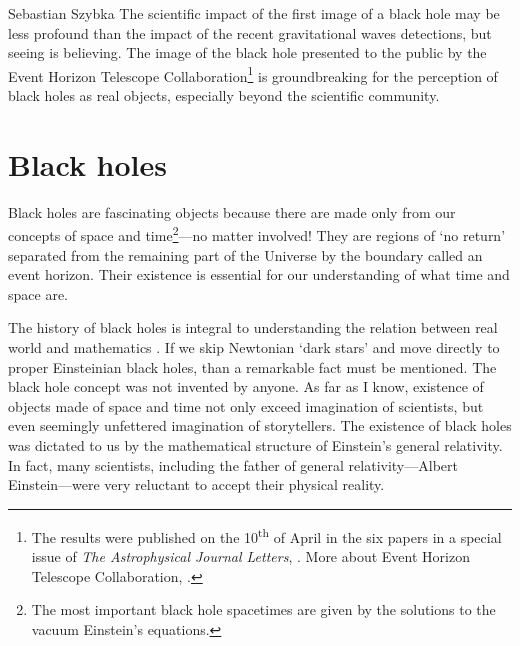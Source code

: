 \begin{artengenv}{Sebastian Szybka}
The scientific impact of the first image of a black hole may be less profound than the impact of the recent gravitational waves detections, but seeing is believing. The image of the black hole presented to the public by the Event Horizon Telescope Collaboration\footnote{The results were published on the 10\textsuperscript{th} of April in the six papers in a special issue of \textit{The Astrophysical Journal Letters}, \parencite[see e.g.][]{the_event_horizon_telescope_collaboration_first_2019}. More about Event Horizon Telescope Collaboration, \parencite[see][]{noauthor_event_nodate}.} is groundbreaking for the perception of black holes as real objects, especially beyond the scientific community. 

\section{Black holes}

Black holes are fascinating objects because there are made only from our concepts of space and time\footnote{The most important black hole spacetimes are given by the solutions to the vacuum Einstein's equations.}---no matter involved! They are regions of `no return' separated from the remaining part of the Universe by the boundary called an event horizon. Their existence is essential for our understanding of what time and space are. 

The history of black holes is integral to understanding the relation between real world and mathematics \parencite{malec_black_2018}. If we skip Newtonian `dark stars' and move directly to proper Einsteinian black holes, than a remarkable fact must be mentioned. The black hole concept was not invented by anyone. As far as I know, existence of objects made of space and time not only exceed imagination of scientists, but even seemingly unfettered imagination of storytellers. The existence of black holes was dictated to us by the mathematical structure of Einstein's general relativity. In fact, many scientists, including the father of general relativity---Albert Einstein---were very reluctant to accept their physical reality.


\end{artengenv}
